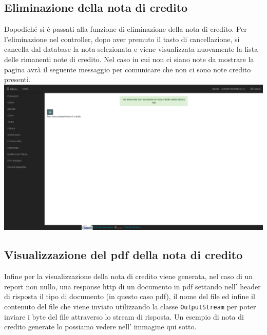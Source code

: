 \documentclass[12pt]{book}
\begin{document}
\subsection{Eliminazione della nota di credito}
Dopodiché si è passati alla funzione di eliminazione della nota di credito.
Per l'eliminazione nel controller, dopo aver premuto il tasto di cancellazione, 
si cancella dal database la nota selezionata e viene
visualizzata nuovamente la lista delle rimanenti note di credito.
Nel caso in cui non ci siano note da mostrare la pagina avrà il seguente 
messaggio per comunicare che non ci sono note credito presenti.
\newline
\newline
\includegraphics[scale=0.4]{img/eliminazione_nota_credito}
\newline
\subsection{Visualizzazione del pdf della nota di credito}
Infine per la visualizzazione della nota di credito viene generata, nel 
caso di un report non nullo, una response http di un documento in pdf
settando nell' header di risposta il tipo di documento (in questo caso pdf),
il nome del file ed infine il contenuto del file che viene inviato utilizzando
la classe \texttt{OutputStream} per poter inviare i byte del file attraverso 
lo stream di risposta.
Un esempio di nota di credito generate lo possiamo vedere nell' immagine 
qui sotto.
\end{document}
